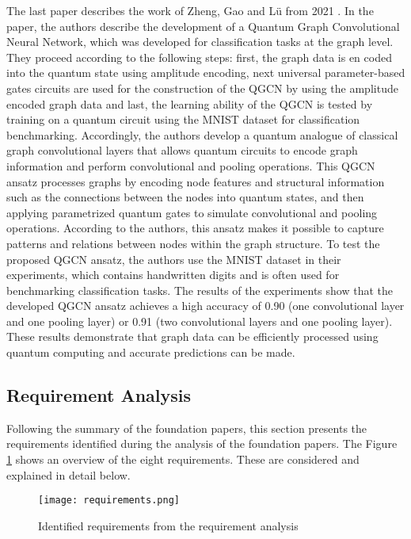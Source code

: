 The last paper describes the work of Zheng, Gao and Lü from 2021 \cite{zheng2021quantum}. In the paper, the authors describe the development of a Quantum Graph Convolutional Neural Network, which was developed for classification tasks at the graph level. They proceed according to the following steps: first, the graph data is en coded into the quantum state using amplitude encoding, next universal parameter-based gates circuits are used for the construction of the QGCN by using the amplitude encoded graph data and last, the learning ability of the QGCN is tested by training on a quantum circuit using the MNIST dataset for classification benchmarking. Accordingly, the authors develop a quantum analogue of classical graph convolutional layers that allows quantum circuits to encode graph information and perform convolutional and pooling operations. This QGCN ansatz processes graphs by encoding node features and structural information such as the connections between the nodes into quantum states, and then applying parametrized quantum gates to simulate convolutional and pooling operations. According to the authors, this ansatz makes it possible to capture patterns and relations between nodes within the graph structure. To test the proposed QGCN ansatz, the authors use the MNIST dataset in their experiments, which contains handwritten digits and is often used for benchmarking classification tasks. The results of the experiments show that the developed QGCN ansatz achieves a high accuracy of 0.90 (one convolutional layer and one pooling layer) or 0.91 (two convolutional layers and one pooling layer). These results demonstrate that graph data can be efficiently processed using quantum computing and accurate predictions can be made.

\subsection{Requirement Analysis}

Following the summary of the foundation papers, this section presents the requirements identified during the analysis of the foundation papers. The Figure \ref{img:requirements} shows an overview of the eight requirements. These are considered and explained in detail below.

\begin{figure}[h!]
    \centering
    \texttt{[image: requirements.png]}
    \caption[Identified requirements from the requirement analysis]{\label{img:requirements}{Identified requirements from the requirement analysis}}
    \end{figure} 

